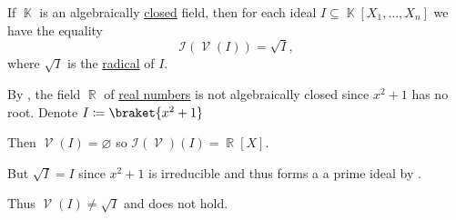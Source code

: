 \begin{theorem}\label{thm:geometric_nullstellensatz}
  If \( \BbbK \) is an algebraically \hyperref[def:algebraically_closed_field]{closed} field, then for each ideal \( I \subseteq \BbbK[X_1, \ldots, X_n] \) we have the equality
  \begin{equation*}
    \mathcal{I}(\mscrV(I)) = \sqrt I,
  \end{equation*}
  where \( \sqrt I \) is the \hyperref[def:radical_ideal]{radical} of \( I \).
\end{theorem}

\begin{example}\label{ex:geometric_nullstellensatz_does_not_hold_for_reals}
  By , the field \( \BbbR \) of \hyperref[def:real_numbers]{real numbers} is not algebraically closed since \( x^2 + 1 \) has no root. Denote \( I \coloneqq \braket{x^2 + 1} \)

  Then \( \mscrV(I) = \varnothing \) so \( \mathcal{I}(\mscrV)(I) = \BbbR[X] \).

  But \( \sqrt{I} = I \) since \( x^2 + 1 \) is irreducible and thus forms a a prime ideal by .

  Thus \( \mscrV(I) \neq \sqrt{I} \) and  does not hold.
\end{example}

